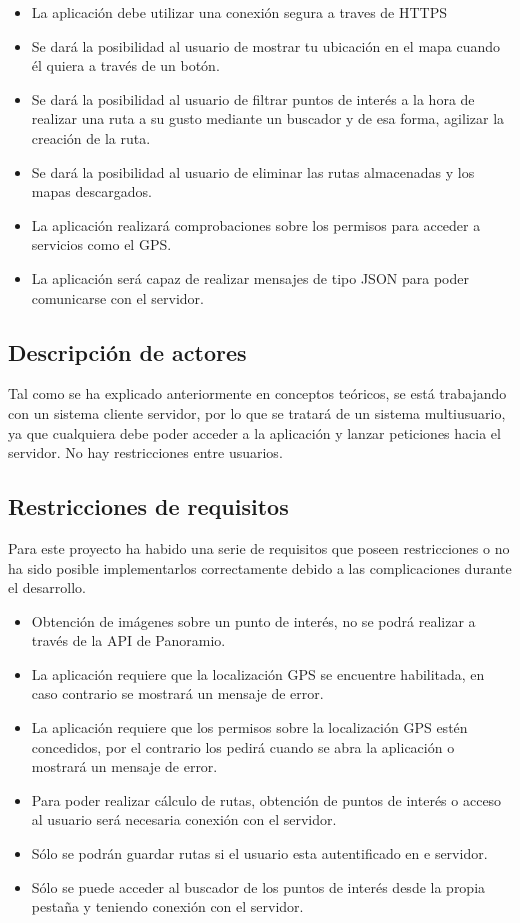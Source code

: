 \begin{itemize}
\item La aplicación debe utilizar una conexión segura a traves de HTTPS
\item Se dará la posibilidad al usuario de mostrar tu ubicación en el mapa cuando él quiera a través de un botón.
\item Se dará la posibilidad al usuario de filtrar puntos de interés a la hora de realizar una ruta a su gusto mediante un buscador y de esa forma, agilizar la creación de la ruta.
\item Se dará la posibilidad al usuario de eliminar las rutas almacenadas y los mapas descargados.
\item La aplicación realizará comprobaciones sobre los permisos para acceder a servicios como el GPS.
\item La aplicación será capaz de realizar mensajes de tipo JSON para poder comunicarse con el servidor.
\end{itemize}

\subsection{Descripción de actores}

Tal como se ha explicado anteriormente en conceptos teóricos, se está trabajando con un sistema cliente servidor, por lo que se tratará de un sistema multiusuario, ya que cualquiera debe poder acceder a la aplicación y lanzar peticiones hacia el servidor. No hay restricciones entre usuarios.

\subsection{Restricciones de requisitos}

Para este proyecto ha habido una serie de requisitos que poseen restricciones o no ha sido posible implementarlos correctamente debido a las complicaciones durante el desarrollo.

\begin{itemize}
\item Obtención de imágenes sobre un punto de interés, no se podrá realizar a través de la API de Panoramio.
\item La aplicación requiere que la localización GPS se encuentre habilitada, en caso contrario se mostrará un mensaje de error.
\item La aplicación requiere que los permisos sobre la localización GPS estén concedidos, por el contrario los pedirá cuando se abra la aplicación o mostrará un mensaje de error.
\item Para poder realizar cálculo de rutas, obtención de puntos de interés o acceso al usuario será necesaria conexión con el servidor.
\item Sólo se podrán guardar rutas si el usuario esta autentificado en e servidor.
\item Sólo se puede acceder al buscador de los puntos de interés desde la propia pestaña y teniendo conexión con el servidor.
\end{itemize}

